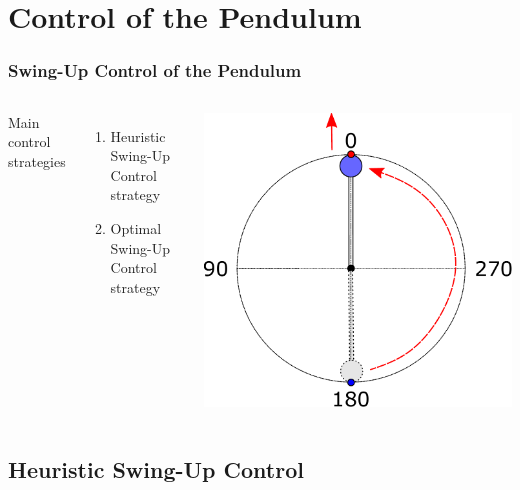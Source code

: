 \documentclass[]{beamer}
\begin{document}
\section{Control of the Pendulum}

\begin{frame}
	\frametitle{Swing-Up Control of the Pendulum}	
	\begin{columns}[c]	
		Main control strategies
		\begin{enumerate}
			\item Heuristic Swing-Up Control strategy\\
			\item Optimal Swing-Up Control strategy
		\end{enumerate}
		\includegraphics[scale=0.29]{images/OP_total.pdf}
	\end{columns}
\end{frame}

\subsection{Heuristic Swing-Up Control}
\end{document}
